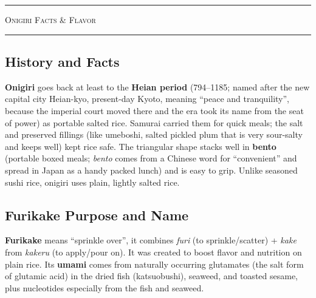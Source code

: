 \documentclass[landscape, a4paper]{article}
\newcommand\alert[1]{\textcolor{PrimaryColor}{\textbf{#1}}}
\begin{document}
\begin{minipage}[t]{0.31\textwidth}
	\vspace{0.5cm}
	\setlength{\parskip}{0.25cm}

	\textcolor{WasabiText}{
		\rule{\linewidth}{0.5mm}
		\vspace{-0.1cm}
		\begin{center}
			\large
			\textsc{Onigiri Facts \& Flavor}
		\end{center}
		\rule{\linewidth}{0.5mm}
	}

	\subsection*{History and Facts}
	\alert{Onigiri} goes back at least to the \alert{Heian period} (794–1185; named after the new capital city Heian-kyo, present-day Kyoto, meaning \enquote{peace and tranquility}, because the imperial court moved there and the era took its name from the seat of power) as portable salted rice. Samurai carried them for quick meals; the salt and preserved fillings (like umeboshi, salted pickled plum that is very sour-salty and keeps well) kept rice safe. The triangular shape stacks well in \alert{bento} (portable boxed meals; \textit{bento} comes from a Chinese word for \enquote{convenient} and spread in Japan as a handy packed lunch) and is easy to grip. Unlike seasoned sushi rice, onigiri uses plain, lightly salted rice. %

	\vspace{0.15cm}
	\subsection*{Furikake Purpose and Name}
	\alert{Furikake} means \enquote{sprinkle over}, it combines \textit{furi} (to sprinkle/scatter) + \textit{kake} from \textit{kakeru} (to apply/pour on). It was created to boost flavor and nutrition on plain rice. Its \alert{umami} comes from naturally occurring glutamates (the salt form of glutamic acid) in the dried fish (katsuobushi), seaweed, and toasted sesame, plus nucleotides especially from the fish and seaweed. %

	\vspace{0.15cm}

\end{minipage}
\end{document}
